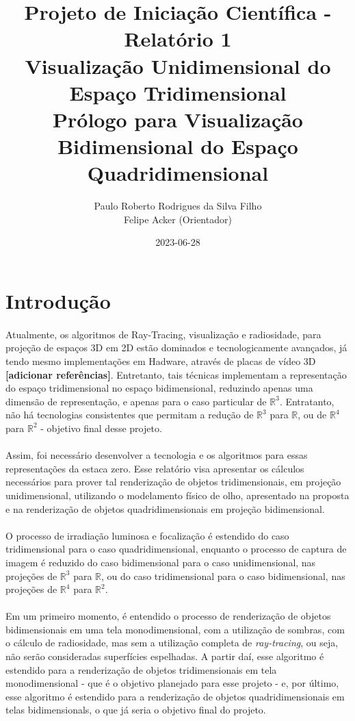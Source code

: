 \documentclass{article}
\title{
	Projeto de Iniciação Científica - Relatório 1\\
	Visualização Unidimensional do Espaço Tridimensional \\
	\large Prólogo para Visualização Bidimensional do Espaço Quadridimensional
}
\date{2023-06-28}
\author{Paulo Roberto Rodrigues da Silva Filho\\ \small Felipe Acker (Orientador)}
\newcommand\R{\mathbb{R}}
\begin{document}
	\renewcommand{\figurename}{Figura}
	\graphicspath{ {./imagens/} }
	\maketitle
	\tableofcontents
	
	\section{Introdução}
	
	\paragraph{}
	Atualmente, os algoritmos de Ray-Tracing, visualização e radiosidade, para projeção de espaços 3D em 2D estão dominados e tecnologicamente avançados, já tendo mesmo implementações em Hadware, através de placas de vídeo 3D \textbf{[adicionar referências]}. Entretanto, tais técnicas implementam a representação do espaço tridimensional no espaço bidimensional, reduzindo apenas uma dimensão de representação, e apenas para o caso particular de $\R^3$. Entratanto, não há tecnologias consistentes que permitam a redução de $\R^3$ para $\R$, ou de $\R^4$ para $\R^2$ - objetivo final desse projeto.
	
	\paragraph{}
	Assim, foi necessário desenvolver a tecnologia e os algoritmos para essas representações da estaca zero. Esse relatório visa apresentar os cálculos necessários para prover tal renderização de objetos tridimensionais, em projeção unidimensional, utilizando o modelamento físico de olho, apresentado na proposta e na renderização de objetos quadridimensionais em projeção bidimensional.
	
	\paragraph{}
	O processo de irradiação luminosa e focalização é estendido do caso tridimensional para o caso quadridimensional, enquanto o processo de captura de imagem é reduzido do caso bidimensional para o caso unidimensional, nas projeções de $\R^3$ para $\R$, ou do caso tridimensional para o caso bidimensional, nas projeções de $\R^4$ para $\R^2$.
	
	\paragraph{}
	Em um primeiro momento, é entendido o processo de renderização de objetos bidimensionais em uma tela monodimensional, com a utilização de sombras, com o cálculo de radiosidade, mas sem a utilização completa de \textit{ray-tracing}, ou seja, não serão consideradas superfícies espelhadas. A partir daí, esse algoritmo é estendido para a renderização de objetos tridimensionais em tela monodimensional - que é o objetivo planejado para esse projeto - e, por último, esse algoritmo é estendido para a renderização de objetos quadridimensionais em telas bidimensionals, o que já seria o objetivo final do projeto. 
	
\end{document}
